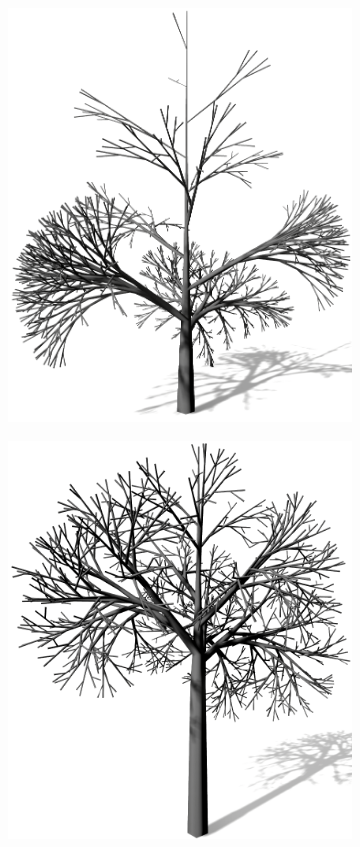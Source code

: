 \begin{figure} [hbtp]
\begin{subfigure}[t]{.45\textwidth}
		\includegraphics[height=.21\textheight]{images/LS_Monopodial_2.png}
		\caption{}
		\label{subfig:LS_Monopodial_2}
	\end{subfigure}	
	\begin{subfigure}[t]{.45\textwidth}
		\centering
		\includegraphics[height=.21\textheight]{images/LS_Monopodial_3.png}

\end{subfigure}
\end{figure}
